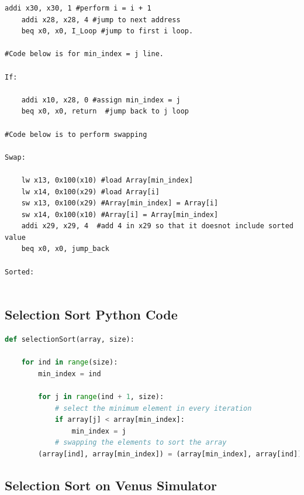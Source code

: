 \documentclass{article}
\begin{document}
\begin{lstlisting}[caption={Selection Sort Assembly code}, captionpos=b, language=RISC-V]
    addi x30, x30, 1 #perform i = i + 1
    addi x28, x28, 4 #jump to next address
    beq x0, x0, I_Loop #jump to first i loop.
    
#Code below is for min_index = j line.

If:

    addi x10, x28, 0 #assign min_index = j
    beq x0, x0, return  #jump back to j loop

#Code below is to perform swapping

Swap:

    lw x13, 0x100(x10) #load Array[min_index]
    lw x14, 0x100(x29) #load Array[i] 
    sw x13, 0x100(x29) #Array[min_index] = Array[i]
    sw x14, 0x100(x10) #Array[i] = Array[min_index]
    addi x29, x29, 4  #add 4 in x29 so that it doesnot include sorted value
    beq x0, x0, jump_back

Sorted:
    

\end{lstlisting}

\subsection{Selection Sort Python Code}

\begin{lstlisting}[caption={Selection Sort Python Code (Taken from GeeksforGeeks)}, captionpos=b, language=Python]
def selectionSort(array, size):

    for ind in range(size):
        min_index = ind

        for j in range(ind + 1, size):
            # select the minimum element in every iteration
            if array[j] < array[min_index]:
                min_index = j
            # swapping the elements to sort the array
        (array[ind], array[min_index]) = (array[min_index], array[ind])    
\end{lstlisting}

\newpage

\subsection{Selection Sort on Venus Simulator}
\end{document}
